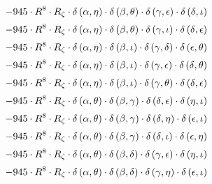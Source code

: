 \begin{subequations}
\begin{gather}
 \\[0.2em] \notag 		 - 945 \cdot R^{8} \cdot R_{\zeta{}} \cdot \delta{}\left(\alpha{}, \eta{}\right) \cdot \delta{}\left(\beta{}, \theta{}\right) \cdot \delta{}\left(\gamma{}, \epsilon{}\right) \cdot \delta{}\left(\delta{}, \iota{}\right) 
 \\[0.2em] \notag 		 - 945 \cdot R^{8} \cdot R_{\zeta{}} \cdot \delta{}\left(\alpha{}, \eta{}\right) \cdot \delta{}\left(\beta{}, \theta{}\right) \cdot \delta{}\left(\gamma{}, \iota{}\right) \cdot \delta{}\left(\delta{}, \epsilon{}\right) 
 \\[0.2em] \notag 		 - 945 \cdot R^{8} \cdot R_{\zeta{}} \cdot \delta{}\left(\alpha{}, \eta{}\right) \cdot \delta{}\left(\beta{}, \iota{}\right) \cdot \delta{}\left(\gamma{}, \delta{}\right) \cdot \delta{}\left(\epsilon{}, \theta{}\right) 
 \\[0.2em] \notag 		 - 945 \cdot R^{8} \cdot R_{\zeta{}} \cdot \delta{}\left(\alpha{}, \eta{}\right) \cdot \delta{}\left(\beta{}, \iota{}\right) \cdot \delta{}\left(\gamma{}, \epsilon{}\right) \cdot \delta{}\left(\delta{}, \theta{}\right) 
 \\[0.2em] \notag 		 - 945 \cdot R^{8} \cdot R_{\zeta{}} \cdot \delta{}\left(\alpha{}, \eta{}\right) \cdot \delta{}\left(\beta{}, \iota{}\right) \cdot \delta{}\left(\gamma{}, \theta{}\right) \cdot \delta{}\left(\delta{}, \epsilon{}\right) 
 \\[0.2em] \notag 		 - 945 \cdot R^{8} \cdot R_{\zeta{}} \cdot \delta{}\left(\alpha{}, \theta{}\right) \cdot \delta{}\left(\beta{}, \gamma{}\right) \cdot \delta{}\left(\delta{}, \epsilon{}\right) \cdot \delta{}\left(\eta{}, \iota{}\right) 
 \\[0.2em] \notag 		 - 945 \cdot R^{8} \cdot R_{\zeta{}} \cdot \delta{}\left(\alpha{}, \theta{}\right) \cdot \delta{}\left(\beta{}, \gamma{}\right) \cdot \delta{}\left(\delta{}, \eta{}\right) \cdot \delta{}\left(\epsilon{}, \iota{}\right) 
 \\[0.2em] \notag 		 - 945 \cdot R^{8} \cdot R_{\zeta{}} \cdot \delta{}\left(\alpha{}, \theta{}\right) \cdot \delta{}\left(\beta{}, \gamma{}\right) \cdot \delta{}\left(\delta{}, \iota{}\right) \cdot \delta{}\left(\epsilon{}, \eta{}\right) 
 \\[0.2em] \notag 		 - 945 \cdot R^{8} \cdot R_{\zeta{}} \cdot \delta{}\left(\alpha{}, \theta{}\right) \cdot \delta{}\left(\beta{}, \delta{}\right) \cdot \delta{}\left(\gamma{}, \epsilon{}\right) \cdot \delta{}\left(\eta{}, \iota{}\right) 
 \\[0.2em] \notag 		 - 945 \cdot R^{8} \cdot R_{\zeta{}} \cdot \delta{}\left(\alpha{}, \theta{}\right) \cdot \delta{}\left(\beta{}, \delta{}\right) \cdot \delta{}\left(\gamma{}, \eta{}\right) \cdot \delta{}\left(\epsilon{}, \iota{}\right) 

\end{gather}
\end{subequations}

